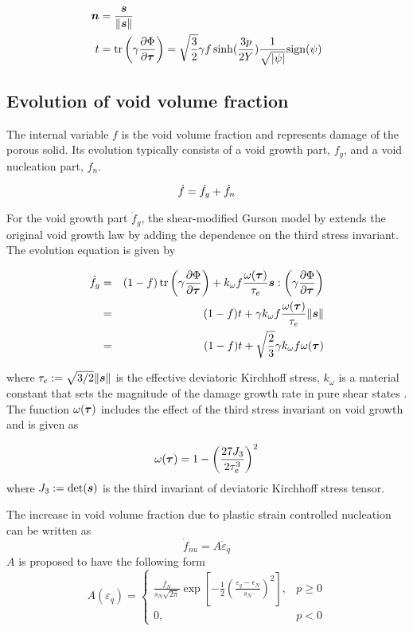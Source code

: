 \begin{align}
{\boldsymbol{n}} &= \frac{{\boldsymbol{s}}}{\|{\boldsymbol{s}}\|}\label{eq:n}\\
t &= \operatorname{\text{tr}} \left( \gamma \frac{\partial\Phi}{\partial{\boldsymbol{\tau}}}\right) = \sqrt{\frac{3}{2}}\gamma f \sinh (\frac{3p}{2 Y})\frac{1}{\sqrt{|\psi|}} {\rm sign}(\psi)\label{eq:t}
\end{align}

\subsection{Evolution of void volume fraction}
The internal variable $f$ is the void volume fraction and represents damage of the porous solid. Its evolution typically consists of a void growth part, $f_g$, and a void nucleation part, $f_{n}$.

\begin{equation}\label{eq:dotf}
\dot{f} = \dot{f}_g + \dot{f}_{n}\\
\end{equation}

For the void growth part $\dot{f}_g$, the shear-modified Gurson model by \cite{Nahshon2008} extends the original void growth law by adding the dependence on the third stress invariant. The evolution equation is given by

\begin{eqnarray}
\dot{f}_g &=& (1-f)\operatorname{\text{tr}}\left( \gamma\frac{\partial\Phi}{\partial{\boldsymbol{\tau}}} \right) + k_{\omega}f\frac{\omega({\boldsymbol{\tau}})}{\tau_e}{\boldsymbol{s}}: \left( \gamma\frac{\partial\Phi}{\partial{\boldsymbol{\tau}}} \right)\\
&=&(1-f)t + \gamma k_{\omega}f\frac{\omega({\boldsymbol{\tau}})}{\tau_e} \|{\boldsymbol{s}}\| \\
&=&(1-f)t + \sqrt{\frac{2}{3}}\gamma k_{\omega}f \omega({\boldsymbol{\tau}})
\end{eqnarray}

where $\tau_e:=\sqrt{3/2}\|{\boldsymbol{s}}\|$ is the effective deviatoric Kirchhoff stress, $k_{\omega}$ is a material constant that sets the magnitude of the damage growth rate in pure shear states \citep{Nahshon2008}. The function $\omega({\boldsymbol{\tau}})$ includes the effect of the third stress invariant on void growth and is given as

\begin{equation}
\omega({\boldsymbol{\tau}}) = 1- \left(\frac{27J_3}{2\tau_e^3}\right)^2
\end{equation}
where $J_3:=\det({\boldsymbol{s}})$ is the third invariant of deviatoric Kirchhoff stress tensor.

The increase in void volume fraction due to plastic strain controlled nucleation can be written as \cite{Chu1980}
\begin{equation}\label{eq:dotf_nu}
\dot{f}_{nu} = A \dot{\varepsilon}_q
\end{equation}
$A$ is proposed to have the following form
\begin{equation}
A(\varepsilon_q) =
	\begin{cases}
		\frac{f_N}{s_N\sqrt{2\pi}}\exp\left[ -\frac{1}{2}\left( \frac{\varepsilon_q - \epsilon_N}{s_N}\right)^2\right], & p \geq 0\\
		0,	  & p <0
	\end{cases}
\end{equation}

